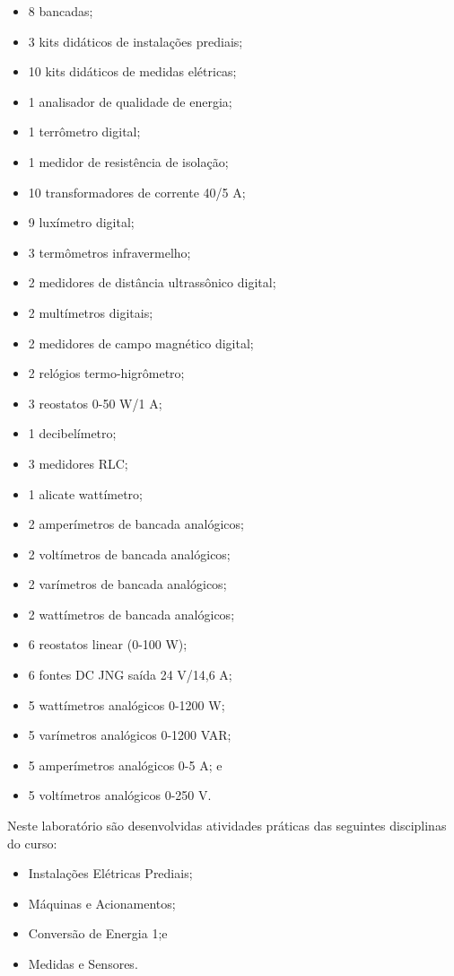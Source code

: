 \begin{itemize}
    \item 8 bancadas;
    \item 3 kits didáticos de instalações prediais; 
    \item 10 kits didáticos de medidas elétricas; 
    \item 1 analisador de qualidade de energia; 
    \item 1 terrômetro digital; 
    \item 1 medidor de resistência de isolação; 
    \item 10 transformadores de corrente 40/5 A; 
    \item 9 luxímetro digital; 
    \item 3 termômetros infravermelho; 
    \item 2 medidores de distância ultrassônico digital; 
    \item 2 multímetros digitais; 
    \item 2 medidores de campo magnético digital;
    \item 2 relógios termo-higrômetro; 
    \item 3 reostatos 0-50 W/1 A; 
    \item 1 decibelímetro; 
    \item 3 medidores RLC; 
    \item 1 alicate wattímetro; 
    \item 2 amperímetros de bancada analógicos; 
    \item 2 voltímetros de bancada analógicos; 
    \item 2 varímetros de bancada analógicos; 
    \item 2 wattímetros de bancada analógicos; 
    \item 6 reostatos linear (0-100 W); 
    \item 6 fontes DC JNG saída 24 V/14,6 A; 
    \item 5 wattímetros analógicos 0-1200 W;
    \item 5 varímetros analógicos 0-1200 VAR; 
    \item 5 amperímetros analógicos 0-5 A; e
    \item 5 voltímetros analógicos 0-250 V.    
\end{itemize}

Neste laboratório são desenvolvidas atividades práticas das seguintes disciplinas do curso:

\begin{itemize}
    \item Instalações Elétricas Prediais;
    \item Máquinas e Acionamentos;
    \item Conversão de Energia 1;e
    \item Medidas e Sensores.    
\end{itemize}

